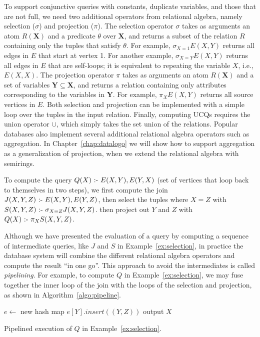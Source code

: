 To support conjunctive queries with constants, 
 duplicate variables, and those that are not full,
 we need two additional operators from relational algebra, 
 namely selection ($\sigma$) and projection ($\pi$).
The selection operator $\sigma$ takes as arguments an atom $R({\bm X})$
 and a predicate $\theta$ over ${\bm X}$,
 and returns a subset of the relation $R$ containing only the tuples that satisfy $\theta$.
For example, $\sigma_{X = 1}E(X, Y)$ returns all edges in $E$ that start at vertex 1.
For another example, $\sigma_{X = Y}E(X, Y)$ returns all edges in $E$ that are self-loops;
 it is equivalent to repeating the variable $X$, i.e., $E(X, X)$.
The projection operator $\pi$ takes as arguments an atom $R({\bm X})$
 and a set of variables ${\bm Y} \subseteq {\bm X}$,
 and returns a relation containing only attributes corresponding 
 to the variables in ${\bm Y}$.
For example, $\pi_{X}E(X, Y)$ returns all source vertices in $E$.
Both selection and projection can be implemented with a simple loop over the tuples in the input relation.
Finally, computing UCQs requires the union operator $\cup$,
 which simply takes the set union of the relations.
Popular databases also implement several additional relational algebra operators 
 such as aggregation.
In Chapter~\ref{chap:datalogo} we will show how to support aggregation
 as a generalization of projection, 
 when we extend the relational algebra with semirings.

\begin{ex}
\label{ex:selection}
To compute the query $Q(X) \text{ :- } E(X, Y), E(Y, X)$ 
 (set of vertices that loop back to themselves in two steps),
 we first compute the join $J(X, Y, Z) \text{ :- } E(X, Y), E(Y, Z)$, 
 then select the tuples where $X = Z$ with $S(X, Y, Z) \text{ :- } \sigma_{X=Z} J(X, Y, Z)$.
 then project out $Y$ and $Z$ with $Q(X) \text{ :- } \pi_{X} S(X, Y, Z)$.
\end{ex}
 
Although we have presented the evaluation of a query 
 by computing a sequence of intermediate queries, 
 like $J$ and $S$ in Example~\ref{ex:selection},
 in practice the database system will combine
 the different relational algebra operators 
 and compute the result ``in one go''.
This approach to avoid the intermediates 
 is called {\em pipelining}.
For example, to compute $Q$ in Example~\ref{ex:selection},
 we may fuse together the inner loop of the join
 with the loops of the selection and projection, 
 as shown in Algorithm~\ref{algo:pipeline}.

\begin{algorithm}
$e \gets $ new hash map \;
{
    $e[Y].insert((Y, Z))$\;
}
{
    {
        {
            output $X$\;
        }
    }
}
\caption{Pipelined execution of $Q$ in Example~\ref{ex:selection}.}
\label{algo:pipeline} 
\end{algorithm}

